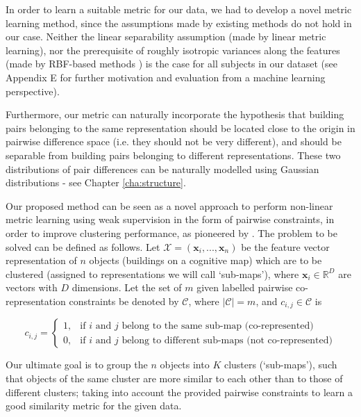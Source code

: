 In order to learn a suitable metric for our data, we had to develop a novel metric learning method, since the assumptions made by existing methods do not hold in our case. Neither the linear separability assumption (made by linear metric learning), nor the prerequisite of roughly isotropic variances along the features (made by RBF-based methods \citep{ong2005learning}) is the case for all subjects in our dataset (see Appendix E for further motivation and evaluation from a machine learning perspective). 

Furthermore, our metric can naturally incorporate the hypothesis that building pairs belonging to the same representation should be located close to the origin in pairwise difference space (i.e. they should not be very different), and should be separable from building pairs belonging to different representations. These two distributions of pair differences can be naturally modelled using Gaussian distributions - see Chapter \ref{cha:structure}. 

Our proposed method can be seen as a novel approach to perform non-linear metric learning using weak supervision in the form of pairwise constraints, in order to improve clustering performance, as pioneered by \cite{xing2002distance}. The problem to be solved can be defined as follows. Let $\mathcal{X}=(\bm x_i, ..., \bm x_n)$ be the feature vector representation of $n$ objects (buildings on a cognitive map) which are to be clustered (assigned to representations we will call `sub-maps'), where $\bm x_i \in \mathbb{R}^D$ are vectors with $D$ dimensions. Let the set of $m$ given labelled pairwise co-representation constraints be denoted by $\mathcal{C}$, where $ \lvert \mathcal{C} \lvert = m $, and $c_{i,j} \in \mathcal{C}$ is

\begin{equation}
c_{i,j}=
\begin{cases}
1, & \text{if $i$ and $j$ belong to the same sub-map (co-represented)} \\
0, & \text{if $i$ and $j$ belong to different sub-maps (not co-represented)}
\end{cases}
\end{equation}

Our ultimate goal is to group the $n$ objects into $K$ clusters (`sub-maps'), such that objects of the same cluster are more similar to each other than to those of different clusters; taking into account the provided pairwise constraints to learn a good similarity metric for the given data.

